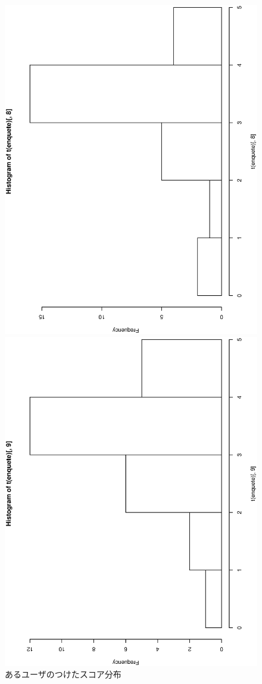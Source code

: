 \documentclass[mingoth,a4paper]{jsarticle}
\begin{document}
\begin{figure}[ht]
\begin{minipage}{0.5\hsize}
 \begin{center}
  \includegraphics[width=0.8\hsize,angle=270]{image201301/score_hist_8.eps}
 \end{center} 
 \caption{あるユーザのつけたスコア分布}
 \label{fig:example-user-score-1}
\end{minipage}
\begin{minipage}{0.5\hsize}
\begin{center}
 \includegraphics[width=0.8\hsize,angle=270]{image201301/score_hist_9.eps}

\end{center}
\end{minipage}
\end{figure}
\end{document}
